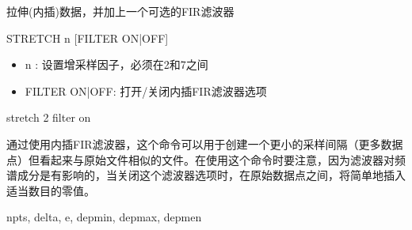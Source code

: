 \label{cmd:stretch}

拉伸(内插)数据，并加上一个可选的FIR滤波器

\begin{SACSTX}
STRETCH  n [FILTER ON|OFF]
\end{SACSTX}

\begin{itemize}
\item n : 设置增采样因子，必须在2和7之间 
\item FILTER ON|OFF: 打开/关闭内插FIR滤波器选项 
\end{itemize}

\begin{SACDFT}
stretch 2 filter on
\end{SACDFT}

通过使用内插FIR滤波器，这个命令可以用于创建一个更小的采样间隔（更多数据点）但看起来与原始文件相似的文件。在使用这个命令时要注意，因为滤波器对频谱成分是有影响的，当关闭这个滤波器选项时，在原始数据点之间，将简单地插入适当数目的零值。

npts, delta, e, depmin, depmax, depmen
